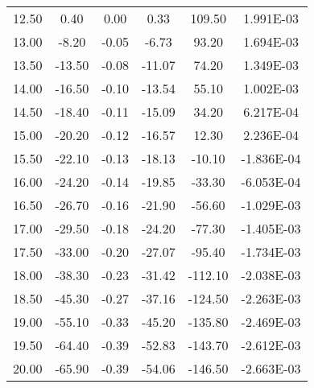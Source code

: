 \documentclass[11pt,a4j]{jsarticle}
\begin{document}
\begin{table}[htb]
\begin{center}
\begin{tabular}{cccccc}
12.50	&	0.40	&	0.00	&	0.33		&	109.50	&	1.991E-03	\\
13.00	&	-8.20	&	-0.05	&	-6.73		&	93.20	&	1.694E-03	\\
13.50	&	-13.50	&	-0.08	&	-11.07		&	74.20	&	1.349E-03	\\
14.00	&	-16.50	&	-0.10	&	-13.54		&	55.10	&	1.002E-03	\\
14.50	&	-18.40	&	-0.11	&	-15.09		&	34.20	&	6.217E-04	\\
15.00	&	-20.20	&	-0.12	&	-16.57		&	12.30	&	2.236E-04	\\
15.50	&	-22.10	&	-0.13	&	-18.13		&	-10.10	&	-1.836E-04	\\
16.00	&	-24.20	&	-0.14	&	-19.85		&	-33.30	&	-6.053E-04	\\
16.50	&	-26.70	&	-0.16	&	-21.90		&	-56.60	&	-1.029E-03	\\
17.00	&	-29.50	&	-0.18	&	-24.20		&	-77.30	&	-1.405E-03	\\
17.50	&	-33.00	&	-0.20	&	-27.07		&	-95.40	&	-1.734E-03	\\
18.00	&	-38.30	&	-0.23	&	-31.42		&	-112.10	&	-2.038E-03	\\
18.50	&	-45.30	&	-0.27	&	-37.16		&	-124.50	&	-2.263E-03	\\
19.00	&	-55.10	&	-0.33	&	-45.20		&	-135.80	&	-2.469E-03	\\
19.50	&	-64.40	&	-0.39	&	-52.83		&	-143.70	&	-2.612E-03	\\
20.00	&	-65.90	&	-0.39	&	-54.06		&	-146.50	&	-2.663E-03	\\ \bottomrule
    \end{tabular}
    \label{tab:price}
  \end{center}
\end{table}
\end{document}
